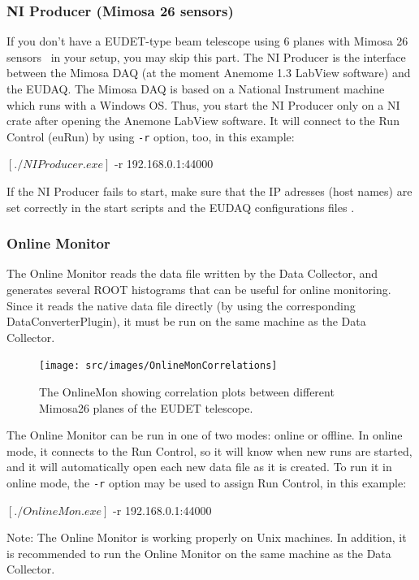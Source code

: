\subsubsection{NI Producer (Mimosa 26 sensors)}
\label{sec:niproducer}

If you don't have a EUDET-type beam telescope using 6 planes with Mimosa 26 sensors~\cite{Jansen:2016} in your setup, you may skip this part.
The NI Producer is the interface between the Mimosa DAQ (at the moment Anemome 1.3 LabView software) and the EUDAQ. 
The Mimosa DAQ is based on a National Instrument machine which runs with a Windows OS. 
Thus, you start the NI Producer only on a NI crate after opening the Anemone LabView software.
It will connect to the Run Control (euRun) by using \texttt{-r} option, too, in this example:
\begin{listing}[mybash]
$[./NIProducer.exe]$ -r 192.168.0.1:44000
\end{listing}
If the NI Producer fails to start, make sure that the IP adresses (host names) are set correctly in the start scripts and the EUDAQ configurations files \cite[section 5.2.1.2 1.]{telescopesWikiUserManual}.


\subsubsection{Online Monitor}
\label{sec:onlinemonitor}
The Online Monitor reads the data file written by the Data Collector,
and generates several ROOT histograms that can be useful for online monitoring.
Since it reads the native data file directly (by using the corresponding DataConverterPlugin), it must be run on the same machine as the Data Collector.

\begin{figure}[htb]
  \begin{center}
    \texttt{[image: src/images/OnlineMonCorrelations]}
    \caption{The OnlineMon showing correlation plots between different
      Mimosa26 planes of the EUDET telescope.}
    \label{fig:OnlineMonPlots}
  \end{center}
\end{figure}

The Online Monitor can be run in one of two modes: online or offline.
In online mode, it connects to the Run Control, so it will know when new runs are started,
and it will automatically open each new data file as it is created.
To run it in online mode, the \texttt{-r} option may be used to assign Run Control, in this example:
\begin{listing}[mybash]
$[./OnlineMon.exe]$ -r 192.168.0.1:44000
\end{listing}
Note: The Online Monitor is working properly on Unix machines. In addition, it is recommended to run the Online Monitor on the same machine as the Data Collector.

